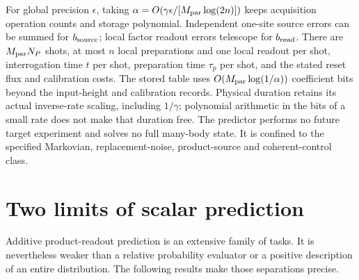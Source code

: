 \documentclass[11pt,reqno]{amsart}
\numberwithin{equation}{section}
\theoremstyle{definition}
\theoremstyle{remark}
\begin{document}
For global precision $\epsilon$, taking $\alpha=O(\gamma\epsilon/[M_{\rm par}\log(2n)])$ keeps acquisition operation counts and storage polynomial. Independent one-site source errors can be summed for $b_{\rm source}$; local factor readout errors telescope for $b_{\rm read}$. There are $M_{\rm par}N_P$ shots, at most $n$ local preparations and one local readout per shot, interrogation time $t$ per shot, preparation time $\tau_p$ per shot, and the stated reset flux and calibration costs. The stored table uses $O(M_{\rm par}\log(1/\alpha))$ coefficient bits beyond the input-height and calibration records. Physical duration retains its actual inverse-rate scaling, including $1/\gamma$; polynomial arithmetic in the bits of a small rate does not make that duration free. The predictor performs no future target experiment and solves no full many-body state. It is confined to the specified Markovian, replacement-noise, product-source and coherent-control class.


\section{Two limits of scalar prediction}\label{sec:obstructions}

Additive product-readout prediction is an extensive family of tasks. It is nevertheless weaker than a relative probability evaluator or a positive description of an entire distribution. The following results make those separations precise.
\end{document}
